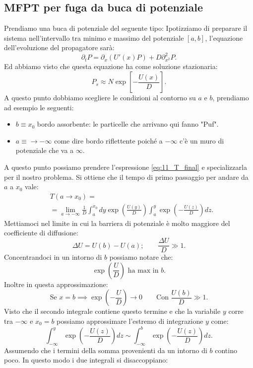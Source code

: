 \subsection{MFPT per fuga da buca di potenziale}%
\label{sub:MFPT per fuga da buca di potenziale}
Prendiamo una buca di potenziale del seguente tipo:
%
\noindent
Ipotizziamo di preparare il sistema nell'intervallo tra minimo e massimo del potenziale $[ a, b ]$, l'equazione dell'evoluzione del propagatore sarà:
\[
    \partial_{t}P = \partial_{x}\left(U'(x) P\right) + D\partial^2_{x^2}P
.\] 
Ed abbiamo visto che questa equazione ha come soluzione stazionaria:
\[
    P_s \approx N\exp\left[-\frac{U(x)}{D}\right]
.\] 
%
\noindent
A questo punto dobbiamo scegliere le condizioni al contorno su $a$ e $b$, prendiamo ad esempio le seguenti:
\begin{itemize}
    \item $b\equiv x_0$ bordo assorbente: le particelle che arrivano qui fanno "Puf".
    \item $a\equiv \to -\infty$ come dire bordo riflettente poiché a $-\infty$ c'è un muro di potenziale che va a $\infty$.
\end{itemize}
A questo punto possiamo prendere l'espressione \ref{eq:11_T_final} e specializzarla per il nostro problema. Si ottiene che il tempo di primo passaggio per andare da $a$ a $x_0$ vale:
\[\begin{aligned}
    &T(a\to x_0) =\\
    & = \lim_{a \to -\infty} \frac{1}{D}\int_{a}^{x_0} dy \exp\left(\frac{U(y)}{D}\right) \int_{a}^{y} \exp\left(-\frac{U(z)}{D}\right)dz 
.\end{aligned}\]
Mettiamoci nel limite in cui la barriera di potenziale è molto maggiore del coefficiente di diffusione:
\[
    \Delta  U = U(b) -U(a); \qquad \frac{\Delta U}{D}\gg 1
.\] 
Concentrandoci in un intorno di $b$ possiamo notare che:
\[
    \exp\left(\frac{U}{D}\right) \text{ ha max in }b
.\] 
Inoltre in questa approssimazione:
\[
    \text{Se } x = b \implies  \exp\left(-\frac{U}{D}\right)\to 0 \qquad \text{Con } \frac{U(b)}{D} \gg 1
.\] 
Visto che il secondo integrale contiene questo termine e che la variabile $y$ corre tra $-\infty$ e $x_0=b$ possiamo approssimare l'estremo di integrazione $y$ come:
\[
 \int_{-\infty}^{y} \exp\left(-\frac{U(z)}{D}\right)dz \sim \int_{-\infty}^{b} \exp\left(-\frac{U(z)}{D}\right)dz   
.\] 
Assumendo che i termini della somma provenienti da un intorno di $b$ contino poco. In questo modo i due integrali si disaccoppiano:
